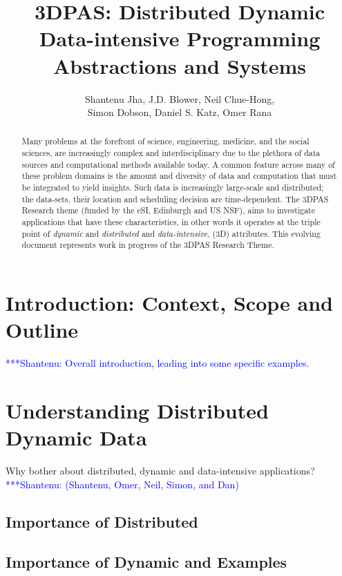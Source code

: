\documentclass[preprint,12pt]{article}
\title{3DPAS: Distributed Dynamic Data-intensive Programming
  Abstractions and Systems}
\author{ Shantenu Jha, J.D. Blower, Neil Chue-Hong, \\[-0.1em]
Simon Dobson, Daniel S. Katz, Omer Rana}
\newcommand{\jhanote}[1]{  {\textcolor{blue}     { ***Shantenu: #1 }}}
\newcommand{\jhanote}[1]{}
\begin{document}
\maketitle

\begin{abstract}
  Many problems at the forefront of science, engineering, medicine,
  and the social sciences, are increasingly complex and
  interdisciplinary due to the plethora of data sources and
  computational methods available today.  A common feature across many
  of these problem domains is the amount and diversity of data and
  computation that must be integrated to yield insights. Such data is
  increasingly large-scale and distributed;
  the data-sets, their location and scheduling decision
  are time-dependent. %
  The 3DPAS Research theme (funded by the eSI, Edinburgh and US NSF),
  aims to investigate applications that have these characteristics, in
  other words it operates at the triple point of {\it dynamic} and
  {\it distributed} and {\it data-intensive}, (3D) attributes.  This
  evolving document represents work in progress of the 3DPAS Research
  Theme.
\end{abstract}

%

\section{Introduction: Context, Scope and Outline}

\jhanote{Overall introduction, leading into some specific examples.}


\section{Understanding Distributed Dynamic Data}

Why bother about distributed, dynamic and data-intensive applications?
\jhanote{(Shantenu, Omer, Neil, Simon, and Dan)}

\subsection{Importance of Distributed}

\subsection{Importance of Dynamic and Examples}
\end{document}
